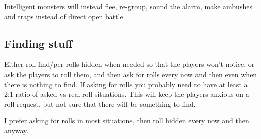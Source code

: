 Intelligent monsters will instead flee, re-group, sound the alarm, make ambushes and traps instead of direct open battle.


\subsection*{Finding stuff}
Either roll find/per rolls hidden when needed so that the players won't notice, or ask the players to roll them, and then ask for rolls every now and then even when there is nothing to find. If asking for rolls you probably need to have at least a 2:1 ratio of asked vs real roll situations. This will keep the players anxious on a roll request, but not sure that there will be something to find.

I prefer asking for rolls in most situations, then roll hidden every now and then anyway.


